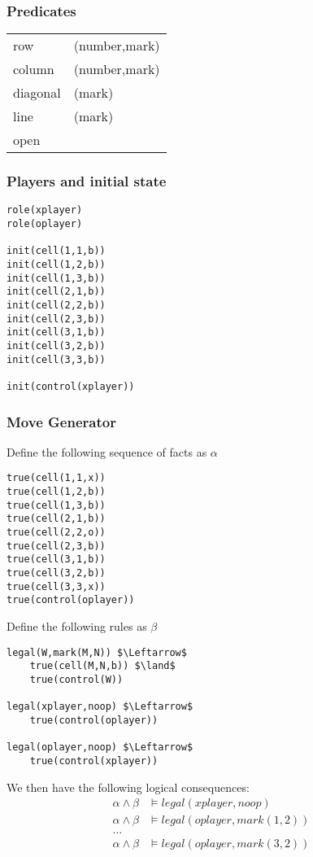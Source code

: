 \subsubsection{Predicates}
\begin{tabular}{ l l }
    row      & (number,mark)\\
    column   & (number,mark)\\
    diagonal & (mark)\\
    line     & (mark)\\
    open
\end{tabular}

\subsubsection{Players and initial state}
\begin{lstlisting}[morekeywords={role,init}]
role(xplayer)
role(oplayer)

init(cell(1,1,b))
init(cell(1,2,b))
init(cell(1,3,b))
init(cell(2,1,b))
init(cell(2,2,b))
init(cell(2,3,b))
init(cell(3,1,b))
init(cell(3,2,b))
init(cell(3,3,b))

init(control(xplayer))
\end{lstlisting}

\subsubsection{Move Generator}
Define the following sequence of facts as $\alpha$
\begin{lstlisting}
true(cell(1,1,x))
true(cell(1,2,b))
true(cell(1,3,b))
true(cell(2,1,b))
true(cell(2,2,o))
true(cell(2,3,b))
true(cell(3,1,b))
true(cell(3,2,b))
true(cell(3,3,x))
true(control(oplayer))
\end{lstlisting}

Define the following rules as $\beta$
\begin{lstlisting}[morekeywords={legal,true}]
legal(W,mark(M,N)) $\Leftarrow$
    true(cell(M,N,b)) $\land$
    true(control(W))

legal(xplayer,noop) $\Leftarrow$
    true(control(oplayer))

legal(oplayer,noop) $\Leftarrow$
    true(control(xplayer))
\end{lstlisting}

We then have the following logical consequences:
\begin{align*}
    \alpha \land \beta &\models legal(xplayer,noop)\\
    \alpha \land \beta &\models legal(oplayer,mark(1,2))\\
    ...\\
    \alpha \land \beta &\models legal(oplayer,mark(3,2))\\
\end{align*}

